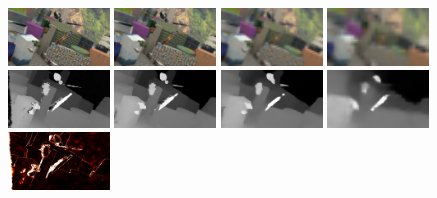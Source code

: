 \documentclass[runningheads]{llncs}
\begin{document}
\begin{figure}
    \begin{center}
        \includegraphics[width=0.24\textwidth,height=0.08\textwidth,clip]{figures/imL_0.png}
        \includegraphics[width=0.24\textwidth,height=0.08\textwidth,clip]{figures/imL_1.png}
        \includegraphics[width=0.24\textwidth,height=0.08\textwidth,clip]{figures/imL_2.png}
        \includegraphics[width=0.24\textwidth,height=0.08\textwidth,clip]{figures/imL_3.png}
        \\
        \includegraphics[width=0.24\textwidth,height=0.08\textwidth,clip]{figures/pred_0.png}
        \includegraphics[width=0.24\textwidth,height=0.08\textwidth,clip]{figures/pred_1.png}
        \includegraphics[width=0.24\textwidth,height=0.08\textwidth,clip]{figures/pred_2.png}
        \includegraphics[width=0.24\textwidth,height=0.08\textwidth,clip]{figures/pred_3.png}
        \\
        \includegraphics[width=0.24\textwidth,height=0.08\textwidth,clip]{figures/pred_0_err.png}

\end{center}
\end{figure}
\end{document}
